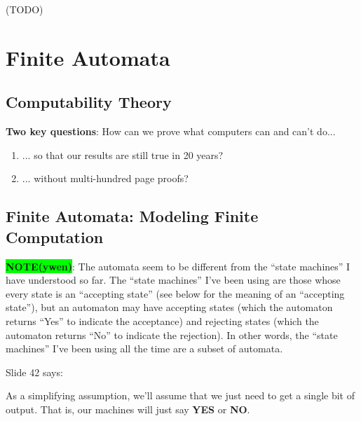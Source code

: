 \documentclass[12pt, letterpaper, oneside]{book}
\begin{document}
 (TODO)

%
%

\chapter{Finite Automata}

\section{Computability Theory}

\textbf{Two key questions}: How can we prove what computers can and can't do...
\begin{enumerate}
  \item ... so that our results are still true in 20 years?
  \item ... without multi-hundred page proofs?
\end{enumerate}

\section{Finite Automata: Modeling Finite Computation}

\colorbox{lime}{\textbf{NOTE(ywen)}}: The automata seem to be different from the ``state machines'' I have understood
so far. The ``state machines'' I've been using are those whose every state is an ``accepting state'' (see below for the
meaning of an ``accepting state''), but an automaton may have accepting states (which the automaton returns ``Yes'' to
indicate the acceptance) and rejecting states (which the automaton returns ``No'' to indicate the rejection). In other
words, the ``state machines'' I've been using all the time are a subset of automata.

Slide 42 says:
\begin{displayquote}
  As a simplifying assumption, we'll assume that we just need to get a single
  bit of output. That is, our machines will just say \textbf{YES} or
  \textbf{NO}.
\end{displayquote}
\end{document}
